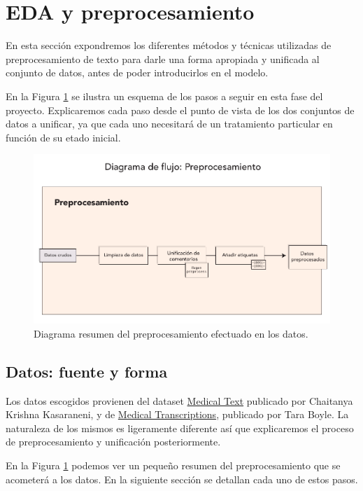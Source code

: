 \section{EDA y preprocesamiento}

En esta sección expondremos los diferentes métodos y técnicas utilizadas de preprocesamiento de texto para darle una forma apropiada y unificada al conjunto de datos, antes de poder introducirlos en el modelo.

En la Figura \ref{fig:preprocess-diagram} se ilustra un esquema de los pasos a seguir en esta fase del proyecto. Explicaremos cada paso desde el punto de vista de los dos conjuntos de datos a unificar, ya que cada uno necesitará de un tratamiento particular en función de su etado inicial.

\begin{figure}[h!]
	\centering
	\includegraphics[width=.9\textwidth]{media/preprocess-diagram.pdf}
	\caption{Diagrama resumen del preprocesamiento efectuado en los datos.}
	\label{fig:preprocess-diagram}
\end{figure}


\subsection{Datos: fuente y forma}
Los datos escogidos provienen del dataset \href{https://www.kaggle.com/chaitanyakck/medical-text}{Medical Text} publicado por Chaitanya Krishna Kasaraneni, y de \href{https://www.kaggle.com/tboyle10/medicaltranscriptions}{Medical Transcriptions}, publicado por Tara Boyle. La naturaleza de los mismos es ligeramente diferente así que explicaremos el proceso de preprocesamiento y unificación posteriormente.

En la Figura \ref{fig:preprocess-diagram} podemos ver un pequeño resumen del preprocesamiento que se acometerá a los datos. En la siguiente sección se detallan cada uno de estos pasos.

